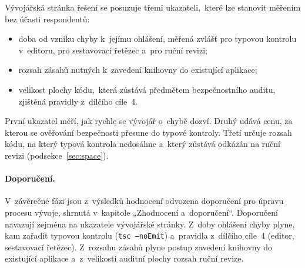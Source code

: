Vývojářská stránka řešení se posuzuje třemi ukazateli,~které lze stanovit měřením bez účasti respondentů:
\begin{itemize}
    \item doba od vzniku chyby k~jejímu ohlášení, měřená zvlášť pro typovou kontrolu v~editoru, pro sestavovací řetězec a~pro ruční revizi;
    \item rozsah zásahů nutných k~zavedení knihovny do existující aplikace;
    \item velikost plochy kódu,~která zůstává předmětem bezpečnostního auditu, zjištěná pravidly z~dílčího cíle~4.
\end{itemize}
První ukazatel měří, jak rychle se vývojář o~chybě dozví. Druhý udává cenu, za kterou se ověřování bezpečnosti přesune do typové kontroly. Třetí určuje rozsah kódu, na který typová kontrola nedosáhne a~který zůstává odkázán na ruční revizi (podsekce~\ref{sec:space}).

\paragraph{Doporučení.}
V~závěrečné fázi jsou z~výsledků hodnocení odvozena doporučení pro úpravu procesu vývoje, shrnutá v~kapitole „Zhodnocení a~doporučení“. Doporučení navazují zejména na ukazatele vývojářské stránky. Z~doby ohlášení chyby plyne, kam zařadit typovou kontrolu (\texttt{tsc --noEmit}) a~pravidla z~dílčího cíle~4 (editor, sestavovací řetězec). Z~rozsahu zásahů plyne postup zavedení knihovny do existující aplikace a~z~velikosti auditní plochy rozsah ruční revize.
